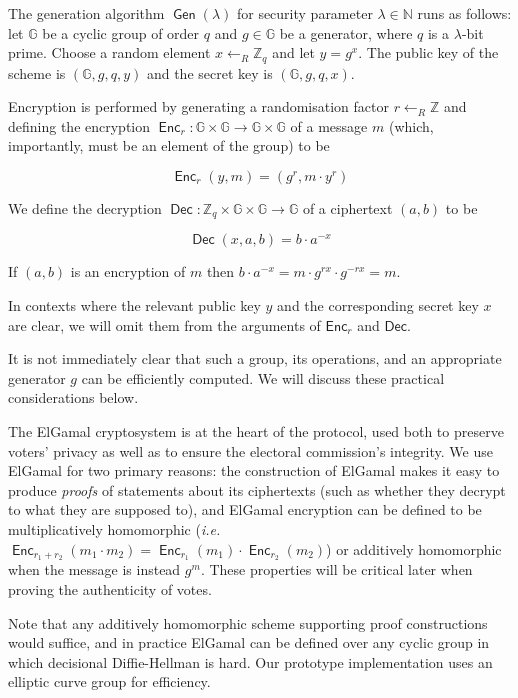 \documentclass[12pt,a4paper]{article}
\DeclareMathOperator{\Gen}{\mathsf{Gen}}
\DeclareMathOperator{\Enc}{\mathsf{Enc}}
\DeclareMathOperator{\Dec}{\mathsf{Dec}}
\theoremstyle{definition}
\newcommand{\ie}{\textit{i.e. }}
\begin{document}
\begin{definition}\label{def-elgamal}
    The generation algorithm $\Gen(\lambda)$ for security parameter $\lambda\in\mathbb{N}$ runs as follows: let $\mathbb{G}$ be a cyclic group of order $q$ and $g\in\mathbb{G}$ be a generator, where $q$ is a $\lambda$-bit prime. Choose a random element $x\gets_R\mathbb{Z}_q$ and let $y=g^x$. 
    The public key of the scheme is $(\mathbb{G}, g, q, y)$ and the secret key is $(\mathbb{G}, g, q, x)$. 

    Encryption is performed by generating a randomisation factor $r\gets_R\mathbb{Z}$ and defining the encryption $\Enc_r:\mathbb{G}\times\mathbb{G}\rightarrow\mathbb{G}\times\mathbb{G}$ of a message $m$ (which, importantly, must be an element of the group) to be
    
    $$\Enc_r(y, m) = (g^r, m\cdot y^r)$$

    We define the decryption $\Dec:\mathbb{Z}_q\times\mathbb{G}\times\mathbb{G}\rightarrow \mathbb{G}$ of a ciphertext $(a, b)$ to be
    
    $$\Dec(x, a, b)=b\cdot a^{-x}$$

    If $(a, b)$ is an encryption of $m$ then $b\cdot a^{-x}=m\cdot g^{rx}\cdot g^{-rx}=m$.
\end{definition}

In contexts where the relevant public key $y$ and the corresponding secret key $x$ are clear, we will omit them from the arguments of $\mathsf{Enc}_r$ and $\mathsf{Dec}$.

It is not immediately clear that such a group, its operations, and an appropriate generator $g$ can be efficiently computed. We will discuss these practical considerations below.

The ElGamal cryptosystem is at the heart of the protocol, used both to preserve voters' privacy as well as to ensure the electoral commission's integrity. We use ElGamal for two primary reasons: the construction of ElGamal makes it easy to produce \textit{proofs} of statements about its ciphertexts (such as whether they decrypt to what they are supposed to), and ElGamal encryption can be defined to be multiplicatively homomorphic (\ie $\Enc_{r_1+r_2}(m_1\cdot m_2)=\Enc_{r_1}(m_1)\cdot\Enc_{r_2}(m_2)$) or additively homomorphic when the message is instead $g^m$. These properties will be critical later when proving the authenticity of votes.

Note that any additively homomorphic scheme supporting proof constructions would suffice, and in practice ElGamal can be defined over any cyclic group in which decisional Diffie-Hellman is hard. Our prototype implementation uses an elliptic curve group for efficiency.
\end{document}
